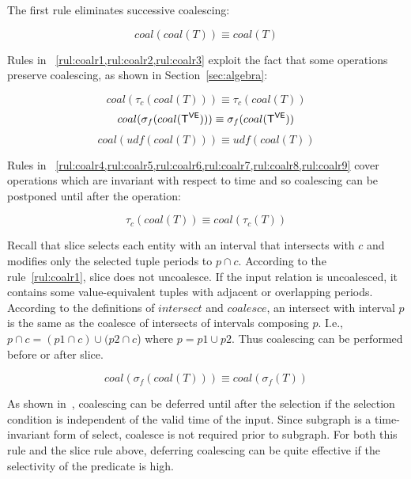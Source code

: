 The first rule eliminates successive coalescing:

\begin{equation}
coal(coal(T)) \equiv coal(T)
\label{rul:coalr0}
\end{equation}

Rules in ~\cref{rul:coalr1,rul:coalr2,rul:coalr3} exploit the
fact that some operations preserve coalescing, as shown in
Section~\ref{sec:algebra}:

\begin{equation}
coal(\tau_c(coal(T))) \equiv \tau_c(coal(T))
\label{rul:coalr1}
\end{equation}
\begin{equation}
coal(\sigma_f(coal(\mathsf{T^{VE}}))) \equiv \sigma_f(coal(\mathsf{T^{VE}}))
\label{rul:coalr2}
\end{equation}
\begin{equation}
coal(udf(coal(T))) \equiv udf(coal(T))
\label{rul:coalr3}
\end{equation}

Rules in
~\cref{rul:coalr4,rul:coalr5,rul:coalr6,rul:coalr7,rul:coalr8,rul:coalr9}
cover operations which are invariant with respect to time and so
coalescing can be postponed until after the operation:

\begin{equation}
\tau_c(coal(T)) \equiv coal(\tau_c(T))
\label{rul:coalr4}
\end{equation}

Recall that slice selects each entity with an interval that intersects
with $c$ and modifies only the selected tuple periods to $p \cap c$.
According to the rule~\ref{rul:coalr1}, slice does not uncoalesce.  If
the input relation is uncoalesced, it contains some value-equivalent
tuples with adjacent or overlapping periods.  According to the
definitions of $intersect$ and $coalesce$, an intersect with interval
$p$ is the same as the coalesce of intersects of intervals composing
$p$.  I.e., $p \cap c = (p1 \cap c) \cup (p2 \cap c$) where $p = p1
\cup p2$.  Thus coalescing can be performed before or after slice.

\begin{equation}
coal(\sigma_f(coal(T))) \equiv coal(\sigma_f(T))
\label{rul:coalr5}
\end{equation}

As shown in~\cite{DBLP:conf/vldb/BohlenSS96}, coalescing can be
deferred until after the selection if the selection condition is
independent of the valid time of the input. Since subgraph is a
time-invariant form of select, coalesce is not required prior to
subgraph.  For both this rule and the slice rule above, deferring
coalescing can be quite effective if the selectivity of the predicate
is high.

